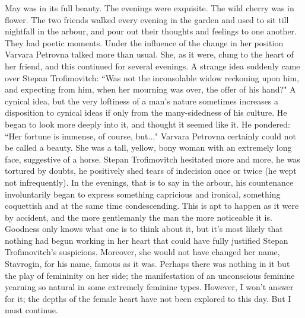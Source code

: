 \documentclass[12pt]{article}
\begin{document}
\vspace{12pt}
May was in its full beauty. The evenings were exquisite. The wild cherry
was in flower. The two friends walked every evening in the garden and
used to sit till nightfall in the arbour, and pour out their thoughts
and feelings to one another. They had poetic moments. Under the
influence of the change in her position Varvara Petrovna talked more
than usual. She, as it were, clung to the heart of her friend, and this
continued for several evenings. A strange idea suddenly came over Stepan
Trofimovitch: ``Was not the inconsolable widow reckoning upon him, and
expecting from him, when her mourning was over, the offer of his hand?"
A cynical idea, but the very loftiness of a man's nature sometimes
increases a disposition to cynical ideas if only from the many-sidedness
of his culture. He began to look more deeply into it, and thought it
seemed like it. He pondered: ``Her fortune is immense, of course, but..."
Varvara Petrovna certainly could not be called a beauty. She was a
tall, yellow, bony woman with an extremely long face, suggestive of a
horse. Stepan Trofimovitch hesitated more and more, he was tortured by
doubts, he positively shed tears of indecision once or twice (he wept
not infrequently). In the evenings, that is to say in the arbour, his
countenance involuntarily began to express something capricious and
ironical, something coquettish and at the same time condescending. This
is apt to happen as it were by accident, and the more gentlemanly the
man the more noticeable it is. Goodness only knows what one is to think
about it, but it's most likely that nothing had begun working in her
heart that could have fully justified Stepan Trofimovitch's suspicions.
Moreover, she would not have changed her name, Stavrogin, for his
name, famous as it was. Perhaps there was nothing in it but the play
of femininity on her side; the manifestation of an unconscious feminine
yearning so natural in some extremely feminine types. However, I won't
answer for it; the depths of the female heart have not been explored to
this day. But I must continue.
\end{document}
